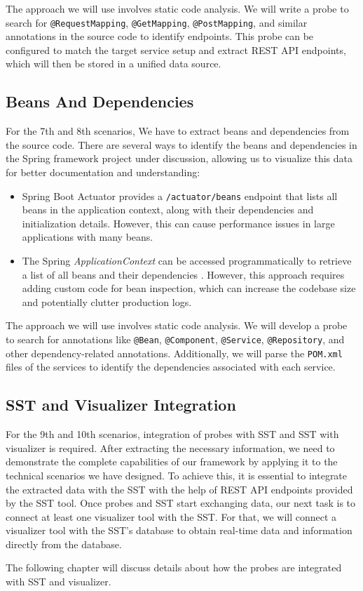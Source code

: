The approach we will use involves static code analysis. We will write a probe to search for \texttt{@RequestMapping}, \texttt{@GetMapping}, \texttt{@PostMapping}, and similar annotations in the source code to identify endpoints. This probe can be configured to match the target service setup and extract REST API endpoints, which will then be stored in a unified data source.

\subsection{Beans And Dependencies}

For the 7th and 8th scenarios, We have to extract beans and dependencies from the source code. There are several ways to identify the beans and dependencies in the Spring framework project under discussion, allowing us to visualize this data for better documentation and understanding:

\begin{itemize}
    \item Spring Boot Actuator provides a \texttt{/actuator/beans} endpoint that lists all beans in the application context, along with their dependencies and initialization details. However, this can cause performance issues in large applications with many beans.
    \item The Spring \textit{ApplicationContext} can be accessed programmatically to retrieve a list of all beans and their dependencies \citep{baeldung_applicationcontext}. However, this approach requires adding custom code for bean inspection, which can increase the codebase size and potentially clutter production logs.
\end{itemize}

The approach we will use involves static code analysis. We will develop a probe to search for annotations like \texttt{@Bean}, \texttt{@Component}, \texttt{@Service}, \texttt{@Repository}, and other dependency-related annotations. Additionally, we will parse the \texttt{POM.xml} files of the services to identify the dependencies associated with each service.

\subsection{SST and Visualizer Integration}

For the 9th and 10th scenarios, integration of probes with SST and SST with visualizer is required. After extracting the necessary information, we need to demonstrate the complete capabilities of our framework by applying it to the technical scenarios we have designed. To achieve this, it is essential to integrate the extracted data with the SST with the help of REST API endpoints provided by the SST tool. Once probes and SST start exchanging data, our next task is to connect at least one visualizer tool with the SST. For that, we will connect a visualizer tool with the SST's database to obtain real-time data and information directly from the database.

The following chapter will discuss details about how the probes are integrated with SST and visualizer.
